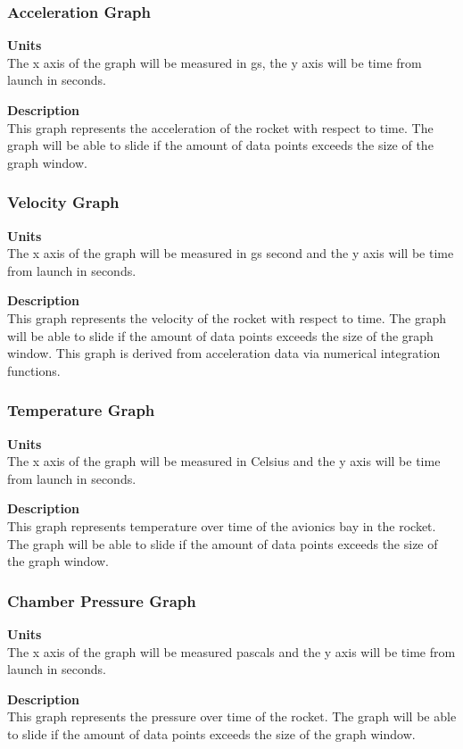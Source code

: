 \documentclass[10pt,draftclsnofoot,onecolumn,compsoc]{IEEEtran}
\begin{document}
\subsubsection{Acceleration Graph}
{\bf Units} \\ The x axis of the graph will be measured in gs, the y axis will be time from launch in seconds.\par
{\bf Description} \\ This graph represents the acceleration of the rocket with respect to time. The graph will be able to slide if the amount of data points exceeds the size of the graph window. \par

\subsubsection{Velocity Graph}
{\bf Units} \\ The x axis of the graph will be measured in gs second and the y axis will be time from launch in seconds.\par
{\bf Description} \\ This graph represents the velocity of the rocket with respect to time. The graph will be able to slide if the amount of data points exceeds the size of the graph window. This graph is derived from acceleration data via numerical integration functions. \par

\subsubsection{Temperature Graph}
{\bf Units} \\ The x axis of the graph will be measured in Celsius and the y axis will be time from launch in seconds.\par
{\bf Description} \\ This graph represents temperature over time of the avionics bay in the rocket. The graph will be able to slide if the amount of data points exceeds the size of the graph window. \par

\subsubsection{Chamber Pressure Graph}
{\bf Units} \\ The x axis of the graph will be measured pascals and the y axis will be time from launch in seconds.\par
{\bf Description} \\ This graph represents the pressure over time of the rocket. The graph will be able to slide if the amount of data points exceeds the size of the graph window. \par
\end{document}
